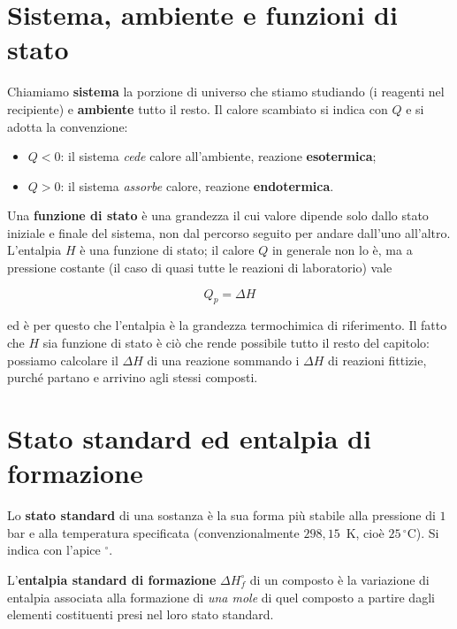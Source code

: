 \documentclass[11pt, a4paper, openright]{book}
\begin{document}
\section{Sistema, ambiente e funzioni di stato}

Chiamiamo \textbf{sistema} la porzione di universo che stiamo studiando (i reagenti nel
recipiente) e \textbf{ambiente} tutto il resto. Il calore scambiato si indica con $Q$ e
si adotta la convenzione:

\begin{itemize}
  \item $Q < 0$: il sistema \emph{cede} calore all'ambiente, reazione \textbf{esotermica};
  \item $Q > 0$: il sistema \emph{assorbe} calore, reazione \textbf{endotermica}.
\end{itemize}

Una \textbf{funzione di stato} è una grandezza il cui valore dipende solo dallo stato
iniziale e finale del sistema, non dal percorso seguito per andare dall'uno all'altro.
L'entalpia $H$ è una funzione di stato; il calore $Q$ in generale non lo è, ma a
pressione costante (il caso di quasi tutte le reazioni di laboratorio) vale

\begin{equation}
  Q_p = \Delta H
\end{equation}

ed è per questo che l'entalpia è la grandezza termochimica di riferimento. Il fatto che
$H$ sia funzione di stato è ciò che rende possibile tutto il resto del capitolo: possiamo
calcolare il $\Delta H$ di una reazione sommando i $\Delta H$ di reazioni fittizie, purché
partano e arrivino agli stessi composti.


\section{Stato standard ed entalpia di formazione}

Lo \textbf{stato standard} di una sostanza è la sua forma più stabile alla pressione di
$1$ bar e alla temperatura specificata (convenzionalmente $298{,}15$~K, cioè $25\,^\circ$C).
Si indica con l'apice $^\circ$.

L'\textbf{entalpia standard di formazione} $\Delta H^\circ_f$ di un composto è la
variazione di entalpia associata alla formazione di \emph{una mole} di quel composto a
partire dagli elementi costituenti presi nel loro stato standard.
\end{document}
